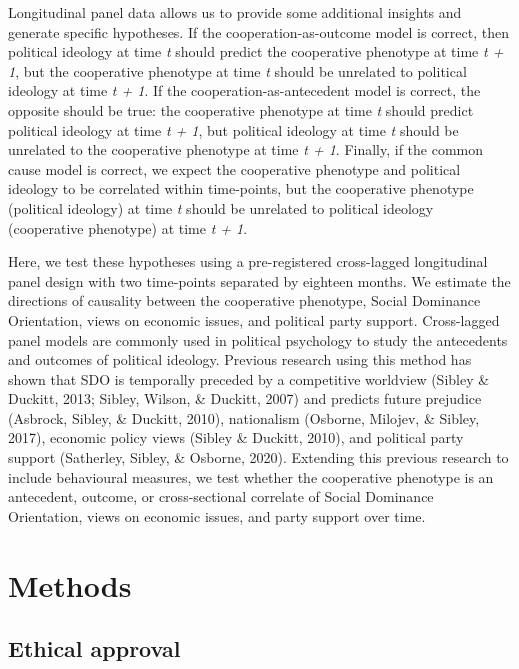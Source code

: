 \documentclass[
  man,floatsintext]{apa6}
\begin{document}
Longitudinal panel data allows us to provide some additional insights and generate specific hypotheses. If the cooperation-as-outcome model is correct, then political ideology at time \emph{t} should predict the cooperative phenotype at time \emph{t + 1}, but the cooperative phenotype at time \emph{t} should be unrelated to political ideology at time \emph{t + 1}. If the cooperation-as-antecedent model is correct, the opposite should be true: the cooperative phenotype at time \emph{t} should predict political ideology at time \emph{t + 1}, but political ideology at time \emph{t} should be unrelated to the cooperative phenotype at time \emph{t + 1}. Finally, if the common cause model is correct, we expect the cooperative phenotype and political ideology to be correlated within time-points, but the cooperative phenotype (political ideology) at time \emph{t} should be unrelated to political ideology (cooperative phenotype) at time \emph{t + 1}.

Here, we test these hypotheses using a pre-registered cross-lagged longitudinal panel design with two time-points separated by eighteen months. We estimate the directions of causality between the cooperative phenotype, Social Dominance Orientation, views on economic issues, and political party support. Cross-lagged panel models are commonly used in political psychology to study the antecedents and outcomes of political ideology. Previous research using this method has shown that SDO is temporally preceded by a competitive worldview (Sibley \& Duckitt, 2013; Sibley, Wilson, \& Duckitt, 2007) and predicts future prejudice (Asbrock, Sibley, \& Duckitt, 2010), nationalism (Osborne, Milojev, \& Sibley, 2017), economic policy views (Sibley \& Duckitt, 2010), and political party support (Satherley, Sibley, \& Osborne, 2020). Extending this previous research to include behavioural measures, we test whether the cooperative phenotype is an antecedent, outcome, or cross-sectional correlate of Social Dominance Orientation, views on economic issues, and party support over time.

\hypertarget{methods}{%
\section{Methods}\label{methods}}

\hypertarget{ethical-approval}{%
\subsection{Ethical approval}\label{ethical-approval}}
\end{document}
